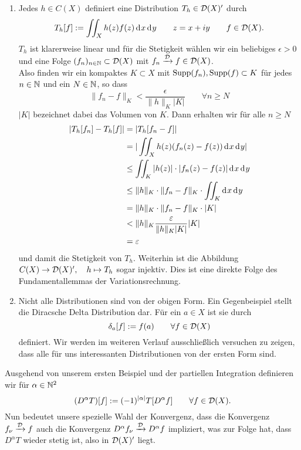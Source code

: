 \begin{bsp}
  \begin{enumerate}
  \item Jedes $h \in C(X)$ definiert eine Distribution $T_h \in
    \mathcal{D}(X)'$ durch
    \[
    T_h[f] := \iint_X h(z) f(z) \d[x]\d[y] \qquad z = x+iy \qquad f
    \in \dist(X).
    \]
    $T_h$ ist klarerweise linear und für die Stetigkeit wählen wir ein
    beliebiges $\epsilon > 0$ und eine Folge $(f_n)_{n \in\mathbb{N}} \subset
    \mathcal{D}(X)$ mit $f_n \xrightarrow{\mathcal{D}} f \in \mathcal{D}(X)$. \\
    Also finden wir ein kompaktes $K \subset X$ mit $\operatorname{Supp}(f_n),
    \operatorname{Supp}(f) \subset K$ für jedes $n \in \mathbb{N}$ und ein $N \in \mathbb{N}$, so
    dass
    \[
    \|f_n -f\|_K < \frac{\epsilon}{\|h\|_K |K|} \qquad \forall n \geq N
    \]
    $|K|$ bezeichnet dabei das Volumen von $K$. Dann erhalten wir für
    alle $n \geq N$
    \begin{align*}
      |T_h[f_n] - T_h[f]| & = | T_h[f_n -f]| \\
      & = | \iint_X h(z) (f_n(z) - f(z)) \d[x]\d[y]| \\
      & \leq \iint_K |h(z)| \cdot |f_n(z) - f(z)| \d[x]\d[y]\\
      & \leq \|h\|_K \cdot\|f_n - f\|_K \cdot \iint_K \d[x] \d[y] \\
      & = \|h\|_K \cdot \|f_n - f\|_K \cdot |K| \\
      & < \|h\|_K \frac{\epsilon}{\|h\|_K |K|} |K| \\
      & = \epsilon
    \end{align*}
    und damit die Stetigkeit von $T_h$.
    Weiterhin ist die Abbildung $C(X) \rightarrow \mathcal{D}(X)', \quad h \mapsto
    T_h$ sogar injektiv. Dies ist eine direkte Folge des 
    Fundamentallemmas der Variationsrechnung.
  \item Nicht alle Distributionen sind von der obigen Form. Ein
    Gegenbeispiel stellt die Diracsche Delta Distribution dar. Für ein
    $a \in X$ ist sie durch
    \[
    \delta_a[f] := f(a) \qquad \forall f \in \mathcal{D}(X)
    \]
    definiert. Wir werden im weiteren Verlauf ausschließlich versuchen
    zu zeigen, dass alle für uns interessanten Distributionen von der
    ersten Form sind.
  \end{enumerate}
\end{bsp}

\begin{defin} 
  Ausgehend von unserem ersten Beispiel und der partiellen Integration
  definieren wir für $\alpha \in \mathbb{N}^2$
  \[
  (D^\alpha T)[f] := (-1)^{|\alpha|} T[D^\alpha f] \qquad \forall f
  \in \mathcal{D}(X).
  \]
  Nun bedeutet unsere spezielle Wahl der Konvergenz, dass die
  Konvergenz $f_\nu \xrightarrow{\mathcal{D}} f$ auch die Konvergenz
  $D^\alpha f_\nu \xrightarrow{\mathcal{D}} D^\alpha f$ impliziert, was zur
  Folge hat, dass $D^\alpha T$ wieder stetig ist, also in $\mathcal{D}(X)'$ liegt.
\end{defin}

